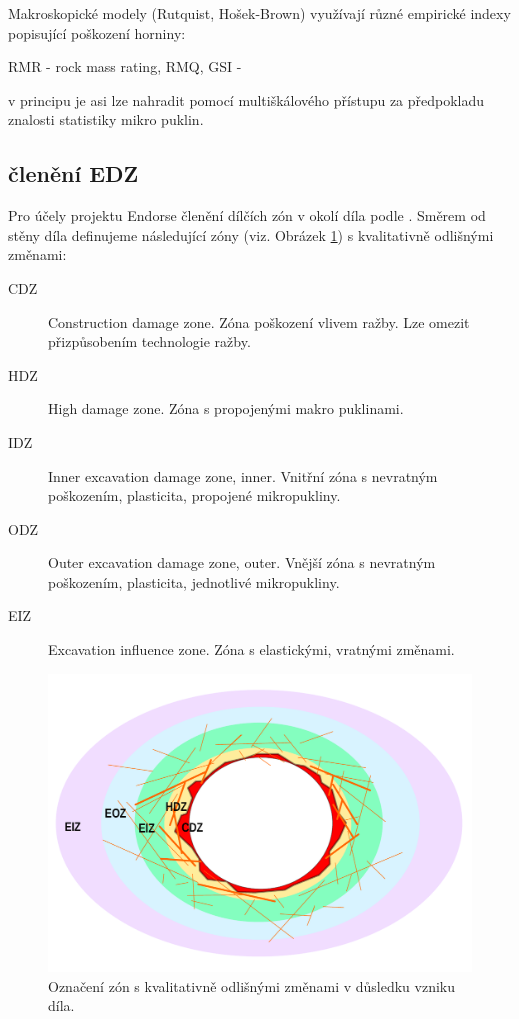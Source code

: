 \documentclass{article}
\begin{document}
Makroskopické modely (Rutquist, Hošek-Brown) využívají různé empirické indexy popisující poškození horniny:

RMR - rock mass rating, RMQ, GSI -

v principu je asi lze nahradit pomocí multiškálového přístupu za předpokladu znalosti 
statistiky mikro puklin. 


                         



\subsection{členění EDZ}
Pro účely projektu Endorse členění dílčích zón v okolí díla podle 
\cite{Perras2016}. Směrem od stěny díla definujeme následující zóny (viz. Obrázek \ref{fig:edz_zones}) 
s kvalitativně odlišnými změnami:
\begin{description}
\item[CDZ] Construction damage zone. Zóna poškození vlivem ražby. Lze omezit přizpůsobením technologie ražby.
\item[HDZ] High damage zone. Zóna s propojenými makro puklinami. 
\item[IDZ] Inner excavation damage zone, inner. Vnitřní zóna s nevratným poškozením, plasticita, propojené mikropukliny.
\item[ODZ] Outer excavation damage zone, outer. Vnější zóna s nevratným poškozením, plasticita, jednotlivé mikropukliny.
\item[EIZ] Excavation influence zone. Zóna s elastickými, vratnými změnami.
\end{description}

\begin{figure}
    \centering
    \includegraphics[width=\textwidth]{graphics/EDZ_structure.pdf}
    \caption{Označení zón s kvalitativně odlišnými změnami v důsledku vzniku díla.}
    \label{fig:edz_zones}
\end{figure}
\end{document}
